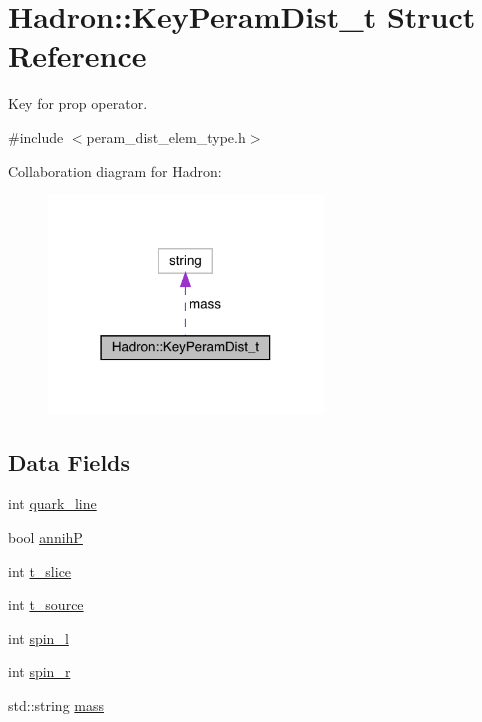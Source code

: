 \hypertarget{structHadron_1_1KeyPeramDist__t}{}\section{Hadron\+:\+:Key\+Peram\+Dist\+\_\+t Struct Reference}
\label{structHadron_1_1KeyPeramDist__t}


Key for prop operator.  




{\ttfamily \#include $<$peram\+\_\+dist\+\_\+elem\+\_\+type.\+h$>$}



Collaboration diagram for Hadron\+:\nopagebreak
\begin{figure}[H]
\begin{center}
\leavevmode
\includegraphics[width=207pt]{db/daf/structHadron_1_1KeyPeramDist__t__coll__graph}
\end{center}
\end{figure}
\subsection*{Data Fields}
\begin{DoxyCompactItemize}
\item 
int \mbox{\hyperlink{structHadron_1_1KeyPeramDist__t_afeb9a1ec56cfe04d4b8f73cce318b0a9}{quark\+\_\+line}}
\item 
bool \mbox{\hyperlink{structHadron_1_1KeyPeramDist__t_a1266f5cfd49dfc4d96c8b72a81c3ea37}{annihP}}
\item 
int \mbox{\hyperlink{structHadron_1_1KeyPeramDist__t_a87f2be4569ea23f3aa0d3560fc0ddcb5}{t\+\_\+slice}}
\item 
int \mbox{\hyperlink{structHadron_1_1KeyPeramDist__t_a71636c4b4d1d7b0be579f932d54ceb35}{t\+\_\+source}}
\item 
int \mbox{\hyperlink{structHadron_1_1KeyPeramDist__t_a7e6cc238281d513f70cfc2a0e5c4b677}{spin\+\_\+l}}
\item 
int \mbox{\hyperlink{structHadron_1_1KeyPeramDist__t_ae222119223bd2bdd94a9ce4c08807dc3}{spin\+\_\+r}}
\item 
std\+::string \mbox{\hyperlink{structHadron_1_1KeyPeramDist__t_ac8f63b2e3a574cb4f63166310f8bf817}{mass}}
\end{DoxyCompactItemize}


